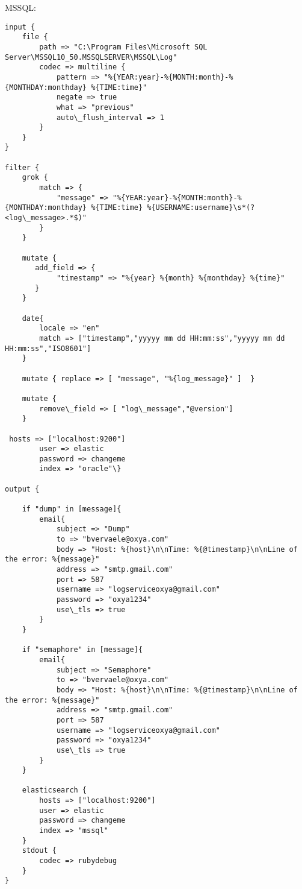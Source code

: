 MSSQL:
\lstset{escapechar=@,style=customc}        
\begin{lstlisting}[frame=single]
input {
    file {
        path => "C:\Program Files\Microsoft SQL Server\MSSQL10_50.MSSQLSERVER\MSSQL\Log"
		codec => multiline {
            pattern => "%{YEAR:year}-%{MONTH:month}-%{MONTHDAY:monthday} %{TIME:time}"
            negate => true
            what => "previous"
			auto\_flush_interval => 1
        }
    }
}
 
filter {    
    grok {
        match => {
            "message" => "%{YEAR:year}-%{MONTH:month}-%{MONTHDAY:monthday} %{TIME:time} %{USERNAME:username}\s*(?<log\_message>.*$)"
        }
    }

	mutate {
       add_field => {
            "timestamp" => "%{year} %{month} %{monthday} %{time}"
       }
    }
	
    date{
        locale => "en"
        match => ["timestamp","yyyyy mm dd HH:mm:ss","yyyyy mm dd HH:mm:ss","ISO8601"]
    }
    
    mutate { replace => [ "message", "%{log_message}" ]  }
    
    mutate {
        remove\_field => [ "log\_message","@version"]
    }
    
 hosts => ["localhost:9200"]
        user => elastic
        password => changeme
        index => "oracle"\}

output {

    if "dump" in [message]{
        email{
            subject => "Dump"
            to => "bvervaele@oxya.com"
            body => "Host: %{host}\n\nTime: %{@timestamp}\n\nLine of the error: %{message}"
            address => "smtp.gmail.com"
            port => 587
            username => "logserviceoxya@gmail.com"
            password => "oxya1234"
            use\_tls => true
        }
    }

    if "semaphore" in [message]{
        email{
            subject => "Semaphore"
            to => "bvervaele@oxya.com"
            body => "Host: %{host}\n\nTime: %{@timestamp}\n\nLine of the error: %{message}"
            address => "smtp.gmail.com"
            port => 587
            username => "logserviceoxya@gmail.com"
            password => "oxya1234"
            use\_tls => true
        }
    }
    
    elasticsearch {
        hosts => ["localhost:9200"]
        user => elastic
        password => changeme
        index => "mssql"
    }
    stdout { 
        codec => rubydebug
    }
}

\end{lstlisting}